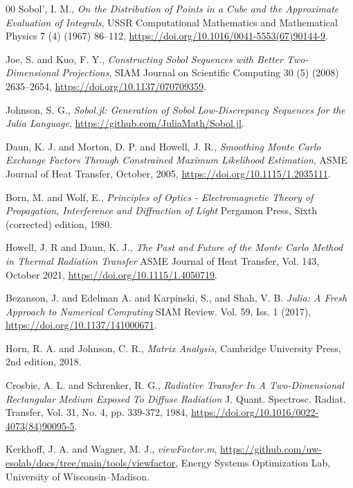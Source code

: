 \documentclass[preprint,1p,times]{elsarticle}
\theoremstyle{plain}
\theoremstyle{definition}
\theoremstyle{remark}
\begin{document}
\begin{thebibliography}{00}
	Sobol', I. M.,
	\textit{On the Distribution of Points in a Cube and the Approximate Evaluation of Integrals},
	USSR Computational Mathematics and Mathematical Physics 7 (4) (1967) 86–112,
	\url{https://doi.org/10.1016/0041-5553(67)90144-9}.

	Joe, S. and Kuo, F. Y.,
	\textit{Constructing Sobol Sequences with Better Two-Dimensional Projections},
	SIAM Journal on Scientific Computing 30 (5) (2008) 2635–2654,
	\url{https://doi.org/10.1137/070709359}.

	Johnson, S. G.,
	\textit{Sobol.jl: Generation of Sobol Low-Discrepancy Sequences for the Julia Language},
	\url{https://github.com/JuliaMath/Sobol.jl}.
	
	Daun, K. J. and Morton, D. P. and Howell, J. R.,
	\textit{Smoothing Monte Carlo Exchange
Factors Through Constrained
Maximum Likelihood Estimation},
	ASME Journal of Heat Transfer,
	October, 2005,
	\url{https://doi.org/10.1115/1.2035111}.

	Born, M. and Wolf, E.,
	\textit{Principles of Optics - Electromagnetic Theory of Propagation, Interference and Diffraction of Light}
	Pergamon Press,
	Sixth (corrected) edition,
	1980.

	Howell, J. R and Daun, K. J.,
	\textit{The Past and Future of the Monte Carlo Method in Thermal Radiation Transfer}
	ASME Journal of Heat Transfer,
	Vol. 143,
	October 2021,
	\url{https://doi.org/10.1115/1.4050719}.
	
	Bezanson, J. and Edelman A. and Karpinski, S., and
Shah, V. B.
	\textit{Julia: A Fresh Approach to Numerical Computing}
	SIAM Review.
	Vol. 59, Iss. 1 (2017),
	\url{https://doi.org/10.1137/141000671}.
	
	Horn, R. A. and Johnson, C. R.,
	\textit{Matrix Analysis},
	Cambridge University Press,
	2nd edition,
	2018.
	
	Crosbie, A. L. and Schrenker, R. G.,
	\textit{Radiative Transfer In A Two-Dimensional Rectangular Medium Exposed To Diffuse Radiation}
	J. Quant. Spectrosc. Radiat. Transfer,
	Vol. 31, No. 4, pp. 339-372, 1984,
	\url{https://doi.org/10.1016/0022-4073(84)90095-5}.

	Kerkhoff, J. A. and Wagner, M. J.,
	\textit{viewFactor.m},
	\url{https://github.com/uw-esolab/docs/tree/main/tools/viewfactor},
	Energy Systems Optimization Lab,
	University of Wisconsin–Madison.
	

\end{thebibliography}
\end{document}
